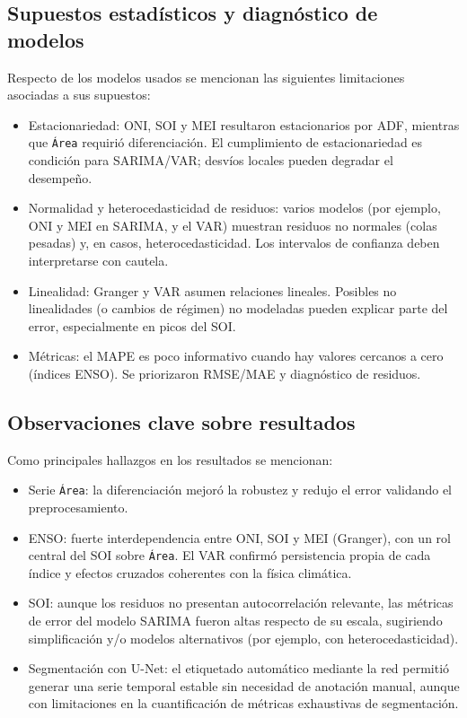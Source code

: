 \subsection{Supuestos estadísticos y diagnóstico de modelos}
Respecto de los modelos usados se mencionan las siguientes limitaciones asociadas a sus supuestos: 
\begin{itemize}
    \item Estacionariedad: ONI, SOI y MEI resultaron estacionarios por ADF, mientras que \texttt{Área} requirió diferenciación. El cumplimiento de estacionariedad es condición para SARIMA/VAR; desvíos locales pueden degradar el desempeño.
    \item Normalidad y heterocedasticidad de residuos: varios modelos (por ejemplo, ONI y MEI en SARIMA, y el VAR) muestran residuos no normales (colas pesadas) y, en casos, heterocedasticidad. Los intervalos de confianza deben interpretarse con cautela.
    \item Linealidad: Granger y VAR asumen relaciones lineales. Posibles no linealidades (o cambios de régimen) no modeladas pueden explicar parte del error, especialmente en picos del SOI.
    \item Métricas: el MAPE es poco informativo cuando hay valores cercanos a cero (índices ENSO). Se priorizaron RMSE/MAE y diagnóstico de residuos.
\end{itemize}

\subsection{Observaciones clave sobre resultados}
Como principales hallazgos en los resultados se mencionan:
\begin{itemize}
    \item Serie \texttt{Área}: la diferenciación mejoró la robustez y redujo el error validando el preprocesamiento.
    \item ENSO: fuerte interdependencia entre ONI, SOI y MEI (Granger), con un rol central del SOI sobre \texttt{Área}. El VAR confirmó persistencia propia de cada índice y efectos cruzados coherentes con la física climática.
    \item SOI: aunque los residuos no presentan autocorrelación relevante, las métricas de error del modelo SARIMA fueron altas respecto de su escala, sugiriendo simplificación y/o modelos alternativos (por ejemplo, con heterocedasticidad).
    \item Segmentación con U-Net: el etiquetado automático mediante la red permitió generar una serie temporal estable sin necesidad de anotación manual, aunque con limitaciones en la cuantificación de métricas exhaustivas de segmentación.
\end{itemize}


